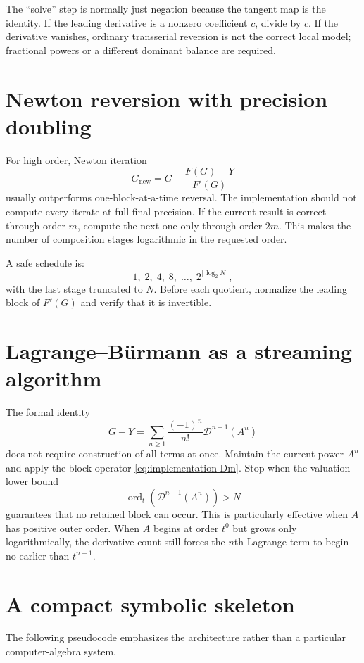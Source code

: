 \documentclass[11pt,oneside]{book}
\theoremstyle{definition}
\theoremstyle{remark}
\DeclareMathOperator{\ord}{ord}
\newcommand{\D}{\mathcal D}
\begin{document}
The ``solve'' step is normally just negation because the tangent map is the
identity. If the leading derivative is a nonzero coefficient $c$, divide
by $c$. If the derivative vanishes, ordinary transserial reversion is not
the correct local model; fractional powers or a different dominant balance
are required.

\section{Newton reversion with precision doubling}
For high order, Newton iteration
\[
 G_{\mathrm{new}}
 =G-\frac{F(G)-Y}{F'(G)}
\]
usually outperforms one-block-at-a-time reversal. The implementation should
not compute every iterate at full final precision. If the current result is
correct through order $m$, compute the next one only through order $2m$.
This makes the number of composition stages logarithmic in the requested
order.

A safe schedule is:
\[
 1,\;2,\;4,\;8,\;\ldots,\;2^{\lceil\log_2N\rceil},
\]
with the last stage truncated to $N$. Before each quotient, normalize the
leading block of $F'(G)$ and verify that it is invertible.

\section{Lagrange--B\"urmann as a streaming algorithm}
The formal identity
\[
 G-Y=\sum_{n\ge1}\frac{(-1)^n}{n!}\D^{n-1}(A^n)
\]
does not require construction of all terms at once. Maintain the current
power $A^n$ and apply the block operator \eqref{eq:implementation-Dm}. Stop
when the valuation lower bound
\[
 \ord_t\!\left(\D^{n-1}(A^n)\right)>N
\]
guarantees that no retained block can occur. This is particularly effective
when $A$ has positive outer order. When $A$ begins at order $t^0$ but grows
only logarithmically, the derivative count still forces the $n$th Lagrange
term to begin no earlier than $t^{n-1}$.

\section{A compact symbolic skeleton}
The following pseudocode emphasizes the architecture rather than a
particular computer-algebra system.
\end{document}
